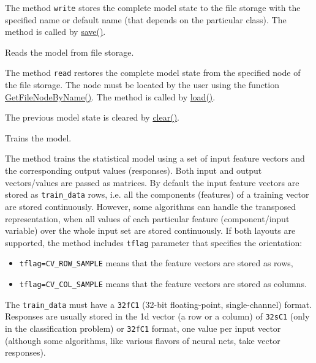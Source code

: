 
The method \texttt{write} stores the complete model state to the file storage with the specified name or default name (that depends on the particular class). The method is called by \href{#CvStatModel.3A.3Asave}{save()}.



Reads the model from file storage.


The method \texttt{read} restores the complete model state from the specified node of the file storage. The node must be located by the user using the function \href{opencvref_cxcore.htm#decl_cvGetFileNodeByName}{GetFileNodeByName()}. The method is called by \href{#CvStatModel_load}{load()}.

The previous model state is cleared by \href{#CvStatModel_clear}{clear()}.



Trains the model.


The method trains the statistical model using a set of input feature vectors and the corresponding output values (responses). Both input and output vectors/values are passed as matrices. By default the input feature vectors are stored as \texttt{train\_data} rows, i.e. all the components (features) of a training vector are stored continuously. However, some algorithms can handle the transposed representation, when all values of each particular feature (component/input variable) over the whole input set are stored continuously. If both layouts are supported, the method includes \texttt{tflag} parameter that specifies the orientation:
\begin{itemize}
 \item \texttt{tflag=CV\_ROW\_SAMPLE} means that the feature vectors are stored as rows,
 \item \texttt{tflag=CV\_COL\_SAMPLE} means that the feature vectors are stored as columns.
\end{itemize}
The \texttt{train\_data} must have a \texttt{32fC1} (32-bit floating-point, single-channel) format. Responses are usually stored in the 1d vector (a row or a column) of \texttt{32sC1} (only in the classification problem) or \texttt{32fC1} format, one value per input vector (although some algorithms, like various flavors of neural nets, take vector responses).

